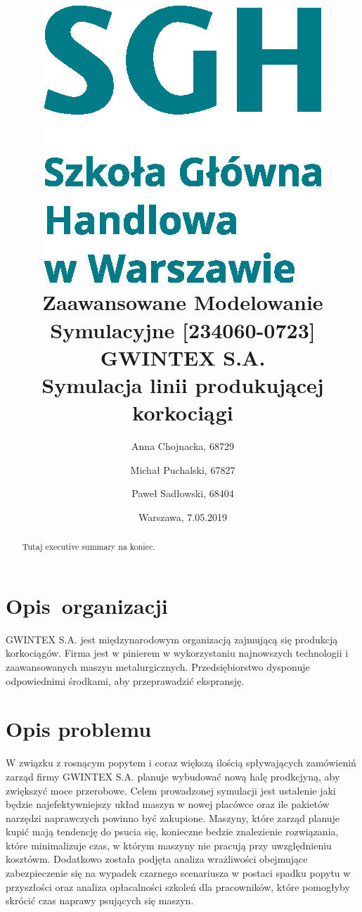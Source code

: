 \documentclass[12pt, a4paper, oneside]{mwart} %
\begin{document}
\title{\includegraphics[width = 0.3 \textwidth]{wykresy/SGHlogotypCMYKpl.eps}\\
\bigskip
Zaawansowane Modelowanie Symulacyjne [234060-0723]\\ 
\bigskip
GWINTEX S.A.\\
Symulacja linii produkującej korkociągi}
\author{Anna Chojnacka, 68729 \and
Michał Puchalski, 67827 \and
Paweł Sadłowski, 68404 }
\date{Warszawa, 7.05.2019}
\maketitle

\pagebreak

\begin{abstract}
Tutaj executive summary na koniec.
\end{abstract}

\pagebreak

\section{Opis~organizacji}
GWINTEX S.A. jest międzynarodowym organizacją zajmującą się produkcją korkociągów. Firma jest w pinierem w wykorzystaniu najnowszych technologii i zaawansowanych maszyn metalurgicznych. Przedsiębiorstwo dysponuje odpowiednimi środkami, aby przeprawadzić ekspransję.

\section{Opis problemu}
W związku z rosnącym popytem i coraz większą ilością spływających zamówieniń zarząd firmy GWINTEX S.A. planuje wybudować nową halę prodkcjyną, aby zwiększyć moce przerobowe. Celem prowadzonej symulacji jest ustalenie jaki będzie najefektywniejszy układ maszyn w nowej placówce oraz ile pakietów narzędzi naprawczych powinno być zakupione. Maszyny, które zarząd planuje kupić mają tendencję do psucia się, konieczne bedzie znalezienie rozwiązania, które minimalizuje czas, w którym maszyny nie pracują przy uwzględnieniu kosztówm. Dodatkowo została podjęta analiza wrażliwości obejmujące zabezpieczenie się na wypadek czarnego scenariusza w postaci spadku popytu w przyszłości oraz analiza opłacalności szkoleń dla pracowników, które pomogłyby skrócić czas naprawy psujących się maszyn.
\end{document}
